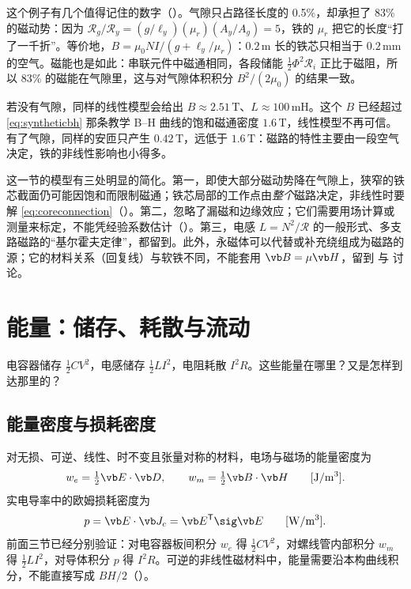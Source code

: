 
这个例子有几个值得记住的数字（）。气隙只占路径长度的 0.5\%，却承担了 83\% 的磁动势：因为 $\mathcal R_g/\mathcal R_y=(g/\ell_y)(\mu_r)(A_y/A_g)=5$，铁的 $\mu_r$ 把它的长度“打了一千折”。等价地，$B=\mu_0NI/(g+\ell_y/\mu_r)$：$0.2\,\mathrm m$ 长的铁芯只相当于 $0.2\,\mathrm{mm}$ 的空气。磁能也是如此：串联元件中磁通相同，各段储能 $\tfrac12\Phi^2\mathcal R_i$ 正比于磁阻，所以 83\% 的磁能在气隙里，这与对气隙体积积分 $B^2/(2\mu_0)$ 的结果一致。

若没有气隙，同样的线性模型会给出 $B\approx2.51\,\mathrm T$、$L\approx100\,\mathrm{mH}$。这个 $B$ 已经超过 \eqref{eq:syntheticbh} 那条教学 B–H 曲线的饱和磁通密度 $1.6\,\mathrm T$，线性模型不再可信。有了气隙，同样的安匝只产生 $0.42\,\mathrm T$，远低于 $1.6\,\mathrm T$：磁路的特性主要由一段空气决定，铁的非线性影响也小得多。

这一节的模型有三处明显的简化。第一，即使大部分磁动势降在气隙上，狭窄的铁芯截面仍可能因饱和而限制磁通；铁芯局部的工作点由\emph{整个}磁路决定，非线性时要解 \eqref{eq:coreconnection}（）。第二，忽略了漏磁和边缘效应；它们需要用场计算或测量来标定，不能凭经验系数估计（）。第三，电感 $L=N^2/\mathcal R$ 的一般形式、多支路磁路的“基尔霍夫定律”，都留到。此外，永磁体可以代替或补充绕组成为磁路的源；它的材料关系（回复线）与软铁不同，不能套用 $\vb B=\mu\vb H$，留到 与 讨论。

\section{能量：储存、耗散与流动}\label{sec:systems-energy}

电容器储存 $\tfrac12CV^2$，电感储存 $\tfrac12LI^2$，电阻耗散 $I^2R$。这些能量在哪里？又是怎样到达那里的？

\subsection{能量密度与损耗密度}
对无损、可逆、线性、时不变且张量对称的材料，电场与磁场的能量密度为
\begin{equation}
w_e=\tfrac12\vb E\cdot\vb D,\qquad w_m=\tfrac12\vb B\cdot\vb H\qquad[\mathrm{J/m^3}].
\label{eq:energydensity}
\end{equation}
实电导率中的欧姆损耗密度为
\begin{equation}
p=\vb E\cdot\vb J_c=\vb E^{\mathsf T}\sig\vb E\qquad[\mathrm{W/m^3}].
\label{eq:lossdensity}
\end{equation}
前面三节已经分别验证：对电容器板间积分 $w_e$ 得 $\tfrac12CV^2$，对螺线管内部积分 $w_m$ 得 $\tfrac12LI^2$，对导体积分 $p$ 得 $I^2R$。可逆的非线性磁材料中，能量需要沿本构曲线积分，不能直接写成 $BH/2$（）。

